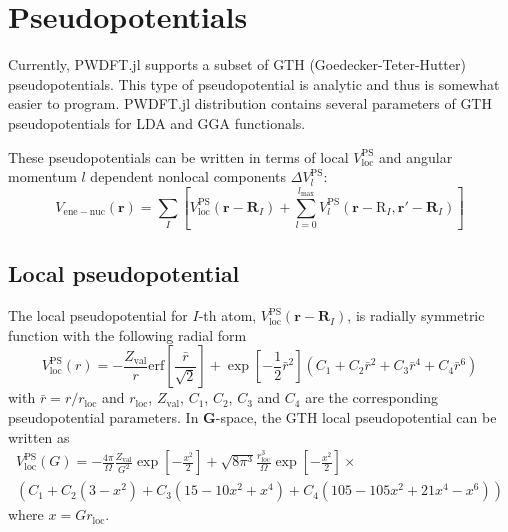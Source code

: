 \section{Pseudopotentials}
%
Currently, \textsf{PWDFT.jl} supports a subset of GTH (Goedecker-Teter-Hutter)
pseudopotentials. This type of pseudopotential is analytic and thus is somewhat
easier to program.
%
\textsf{PWDFT.jl} distribution contains several parameters
of GTH pseudopotentials for LDA and GGA functionals.

These pseudopotentials can be written in terms of
local $V^{\mathrm{PS}}_{\mathrm{loc}}$ and
angular momentum $l$ dependent
nonlocal components $\Delta V^{\mathrm{PS}}_{l}$:
\begin{equation}
V_{\mathrm{ene-nuc}}(\mathbf{r}) =
\sum_{I} \left[
V^{\mathrm{PS}}_{\mathrm{loc}}(\mathbf{r}-\mathbf{R}_{I}) +
\sum_{l=0}^{l_{\mathrm{max}}}
V^{\mathrm{PS}}_{l}(\mathbf{r}-\mathrm{R}_{I},\mathbf{r}'-\mathbf{R}_{I})
\right]
\end{equation}



\subsection{Local pseudopotential}

The local pseudopotential for
$I$-th atom, $V^{\mathrm{PS}}_{\mathrm{loc}}(\mathbf{r}-\mathbf{R}_{I})$,
is radially symmetric
function with the following radial form
\begin{equation}
V^{\mathrm{PS}}_{\mathrm{loc}}(r) =
-\frac{Z_{\mathrm{val}}}{r}\mathrm{erf}\left[
\frac{\bar{r}}{\sqrt{2}} \right] +
\exp\left[-\frac{1}{2}\bar{r}^2\right]\left(
C_{1} + C_{2}\bar{r}^2 + C_{3}\bar{r}^4 + C_{4}\bar{r}^6
\right)
\label{eq:V_ps_loc_R}
\end{equation}
with $\bar{r}=r/r_{\mathrm{loc}}$ and $r_{\mathrm{loc}}$, $Z_{\mathrm{val}}$,
$C_{1}$, $C_{2}$, $C_{3}$ and $C_{4}$ are the corresponding pseudopotential
parameters.
In $\mathbf{G}$-space, the GTH local pseudopotential can be written as
\begin{multline}
V^{\mathrm{PS}}_{\mathrm{loc}}(G) = -\frac{4\pi}{\Omega}\frac{Z_{\mathrm{val}}}{G^2}
\exp\left[-\frac{x^2}{2}\right] +
\sqrt{8\pi^3} \frac{r^{3}_{\mathrm{loc}}}{\Omega}\exp\left[-\frac{x^2}{2}\right]\times\\
\left( C_{1} + C_{2}(3 - x^2) + C_{3}(15 - 10x^2 + x^4) + C_{4}(105 - 105x^2 + 21x^4 - x^6) \right)
\label{eq:V_ps_loc_G}
\end{multline}
where $x=G r_{\mathrm{loc}}$.

